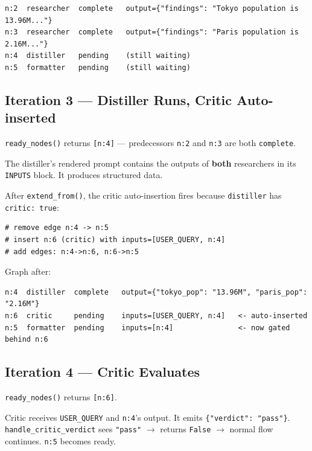 \documentclass[12pt,a4paper]{article}
\begin{document}
\begin{lstlisting}[style=plaincode]
n:2  researcher  complete   output={"findings": "Tokyo population is 13.96M..."}
n:3  researcher  complete   output={"findings": "Paris population is 2.16M..."}
n:4  distiller   pending    (still waiting)
n:5  formatter   pending    (still waiting)
\end{lstlisting}

\subsection{Iteration 3 — Distiller Runs, Critic Auto-inserted}

\texttt{ready\_nodes()} returns \texttt{[n:4]} — predecessors \texttt{n:2} and
\texttt{n:3} are both \texttt{complete}.

The distiller's rendered prompt contains the outputs of \textbf{both}
researchers in its \texttt{INPUTS} block. It produces structured data.

After \texttt{extend\_from()}, the critic auto-insertion fires because
\texttt{distiller} has \texttt{critic: true}:

\begin{lstlisting}[style=pycode, caption={Critic auto-insertion — flow.py:161--179}]
# remove edge n:4 -> n:5
# insert n:6 (critic) with inputs=[USER_QUERY, n:4]
# add edges: n:4->n:6, n:6->n:5
\end{lstlisting}

Graph after:

\begin{lstlisting}[style=plaincode]
n:4  distiller  complete   output={"tokyo_pop": "13.96M", "paris_pop": "2.16M"}
n:6  critic     pending    inputs=[USER_QUERY, n:4]   <- auto-inserted
n:5  formatter  pending    inputs=[n:4]               <- now gated behind n:6
\end{lstlisting}

\subsection{Iteration 4 — Critic Evaluates}

\texttt{ready\_nodes()} returns \texttt{[n:6]}.

Critic receives \texttt{USER\_QUERY} and \texttt{n:4}'s output. It emits
\texttt{\{"verdict": "pass"\}}. \texttt{handle\_critic\_verdict} sees
\texttt{"pass"} $\rightarrow$ returns \texttt{False} $\rightarrow$ normal flow
continues. \texttt{n:5} becomes ready.
\end{document}
